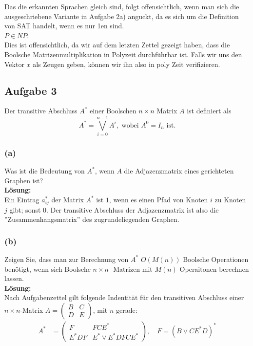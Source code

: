 \documentclass[11pt,a4paper,ngerman]{article}
\begin{document}
Das die erkannten Sprachen gleich sind, folgt offensichtlich, wenn man sich die ausgeschriebene Variante in Aufgabe 2a) anguckt,
da es sich um die Definition von SAT handelt, wenn es nur 1en sind.\\

$P \in NP$:\\
Dies ist offensichtlich, da wir auf dem letzten Zettel gezeigt haben, dass die Boolsche Matrizenmultiplikation in Polyzeit durchführbar ist.
Falls wir uns den Vektor $x$ als Zeugen geben, können wir ihn also in poly Zeit verifizieren.

\subsection*{Aufgabe 3}

Der transitive Abschluss $A^*$ einer Boolschen $n \times n$ Matrix $A$ ist definiert als
\begin{equation*}
    A^* = \overset{n-1}{\underset{i=0}{\bigvee}} A^i,\text{ wobei }A^0 = I_n\text{ ist.}
\end{equation*}

\subsubsection*{(a)}
Was ist die Bedeutung von $A^*$, wenn $A$ die Adjazenzmatrix eines gerichteten Graphen ist?\\

\textbf{Lösung:}\\
Ein Eintrag $a^{*}_{ij}$ der Matrix $A^*$ ist $1$, wenn es einen Pfad von Knoten $i$ zu Knoten $j$ gibt; sonst $0$. Der transitive Abschluss der Adjazenzmatrix ist also die ''Zusammenhangsmatrix'' des zugrundeliegenden Graphen.

\subsubsection*{(b)}
Zeigen Sie, dass man zur Berechnung von $A^*$ $O(M(n))$ Boolsche Operationen benötigt, wenn sich Boolsche $n \times n$- Matrizen mit $M(n)$ Operaitonen berechnen lassen.\\

\textbf{Lösung:}\\
Nach Aufgabenzettel gilt folgende Indentität für den transitiven Abschluss einer $n \times n$-Matrix
$ A = \left(\begin{array}{cc} 
        B & C \\
        D & E
      \end{array} \right)$, mit $n$ gerade:
\begin{equation*}\begin{split}
A^* &= \left(\begin{array}{cc}
        F & FCE^* \\
        E^* DF & E^* \lor E^*DFCE^*
       \end{array} \right), \quad
        F = (B \lor CE^*D)^*
\end{split}\end{equation*}
\end{document}
